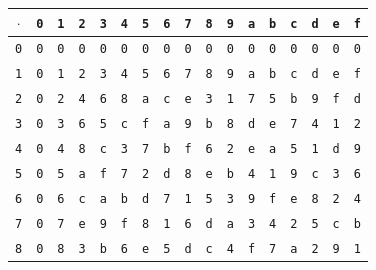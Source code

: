 \begin{table}[htbp]
\centering
\setlength{\tabcolsep}{4.2pt}
\begin{tabular}{@{}c@{}c@{}c@{}c@{}c@{}c@{}c@{}c@{}c@{}c@{}c@{}c@{}c@{}c@{}c@{}c@{}c@{}}
\toprule
$\cdot$ & \texttt{0} & \texttt{1} & \texttt{2} & \texttt{3} & \texttt{4} & \texttt{5} & \texttt{6} & \texttt{7} & \texttt{8} & \texttt{9} & \texttt{a} & \texttt{b} & \texttt{c} & \texttt{d} & \texttt{e} & \texttt{f}\\
\midrule
\texttt{0} & \texttt{0} & \texttt{0} & \texttt{0} & \texttt{0} & \texttt{0} & \texttt{0} & \texttt{0} & \texttt{0} & \texttt{0} & \texttt{0} & \texttt{0} & \texttt{0} & \texttt{0} & \texttt{0} & \texttt{0} & \texttt{0}\\
\texttt{1} & \texttt{0} & \texttt{1} & \texttt{2} & \texttt{3} & \texttt{4} & \texttt{5} & \texttt{6} & \texttt{7} & \texttt{8} & \texttt{9} & \texttt{a} & \texttt{b} & \texttt{c} & \texttt{d} & \texttt{e} & \texttt{f}\\
\texttt{2} & \texttt{0} & \texttt{2} & \texttt{4} & \texttt{6} & \texttt{8} & \texttt{a} & \texttt{c} & \texttt{e} & \texttt{3} & \texttt{1} & \texttt{7} & \texttt{5} & \texttt{b} & \texttt{9} & \texttt{f} & \texttt{d}\\
\texttt{3} & \texttt{0} & \texttt{3} & \texttt{6} & \texttt{5} & \texttt{c} & \texttt{f} & \texttt{a} & \texttt{9} & \texttt{b} & \texttt{8} & \texttt{d} & \texttt{e} & \texttt{7} & \texttt{4} & \texttt{1} & \texttt{2}\\
\texttt{4} & \texttt{0} & \texttt{4} & \texttt{8} & \texttt{c} & \texttt{3} & \texttt{7} & \texttt{b} & \texttt{f} & \texttt{6} & \texttt{2} & \texttt{e} & \texttt{a} & \texttt{5} & \texttt{1} & \texttt{d} & \texttt{9}\\
\texttt{5} & \texttt{0} & \texttt{5} & \texttt{a} & \texttt{f} & \texttt{7} & \texttt{2} & \texttt{d} & \texttt{8} & \texttt{e} & \texttt{b} & \texttt{4} & \texttt{1} & \texttt{9} & \texttt{c} & \texttt{3} & \texttt{6}\\
\texttt{6} & \texttt{0} & \texttt{6} & \texttt{c} & \texttt{a} & \texttt{b} & \texttt{d} & \texttt{7} & \texttt{1} & \texttt{5} & \texttt{3} & \texttt{9} & \texttt{f} & \texttt{e} & \texttt{8} & \texttt{2} & \texttt{4}\\
\texttt{7} & \texttt{0} & \texttt{7} & \texttt{e} & \texttt{9} & \texttt{f} & \texttt{8} & \texttt{1} & \texttt{6} & \texttt{d} & \texttt{a} & \texttt{3} & \texttt{4} & \texttt{2} & \texttt{5} & \texttt{c} & \texttt{b}\\
\texttt{8} & \texttt{0} & \texttt{8} & \texttt{3} & \texttt{b} & \texttt{6} & \texttt{e} & \texttt{5} & \texttt{d} & \texttt{c} & \texttt{4} & \texttt{f} & \texttt{7} & \texttt{a} & \texttt{2} & \texttt{9} & \texttt{1}\\

\end{tabular}
\end{table}
